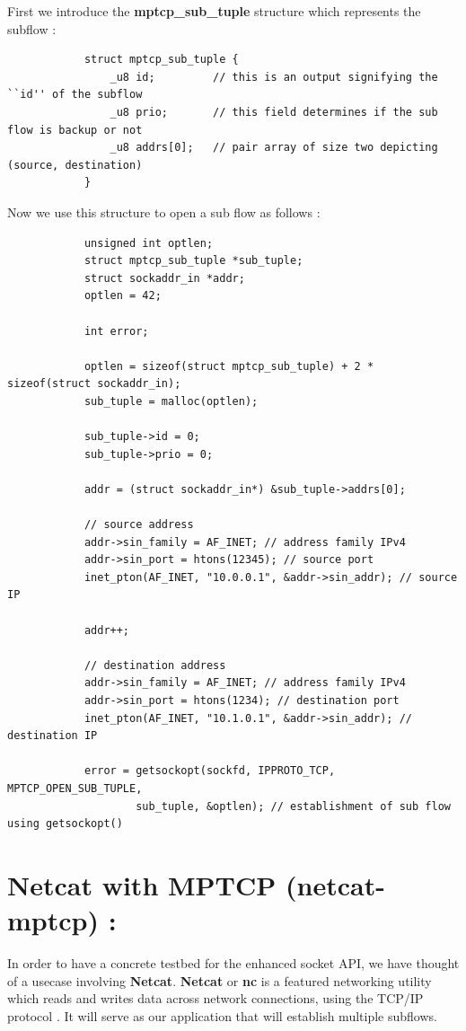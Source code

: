 \documentclass[a4paper,11pt]{article}
\begin{document}
			First we introduce the \textbf{mptcp\_sub\_tuple} structure which represents the subflow :
			\begin{lstlisting}
			struct mptcp_sub_tuple {
				_u8 id;			// this is an output signifying the ``id'' of the subflow
				_u8 prio;		// this field determines if the sub flow is backup or not
				_u8 addrs[0];	// pair array of size two depicting (source, destination)
			}
			\end{lstlisting}
			Now we use this structure to open a sub flow as follows :
			\begin{lstlisting}
   			unsigned int optlen;
   			struct mptcp_sub_tuple *sub_tuple;
   			struct sockaddr_in *addr;
   			optlen = 42;

   			int error;

   			optlen = sizeof(struct mptcp_sub_tuple) + 2 * sizeof(struct sockaddr_in);
   			sub_tuple = malloc(optlen);

   			sub_tuple->id = 0;
   			sub_tuple->prio = 0;

   			addr = (struct sockaddr_in*) &sub_tuple->addrs[0];

   			// source address
   			addr->sin_family = AF_INET; // address family IPv4
   			addr->sin_port = htons(12345); // source port
   			inet_pton(AF_INET, "10.0.0.1", &addr->sin_addr); // source IP

   			addr++;

   			// destination address
   			addr->sin_family = AF_INET; // address family IPv4
   			addr->sin_port = htons(1234); // destination port
   			inet_pton(AF_INET, "10.1.0.1", &addr->sin_addr); // destination IP

   			error = getsockopt(sockfd, IPPROTO_TCP, MPTCP_OPEN_SUB_TUPLE,
                    sub_tuple, &optlen); // establishment of sub flow using getsockopt()
			\end{lstlisting}

		

	
	\section{Netcat with MPTCP (netcat-mptcp) :}
		\label{sec:netcat-mptcp}
		In order to have a concrete testbed for the enhanced socket API, we have thought of a usecase involving \textbf{Netcat}. \textbf{Netcat} or \textbf{nc} is a featured networking utility which reads and writes data across network connections, using the TCP/IP protocol \cite{nc}. It will serve as our application that will establish multiple subflows.
\end{document}
